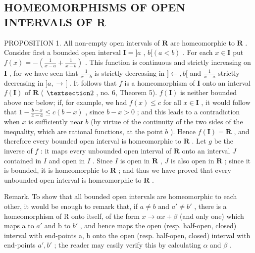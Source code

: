 \subsection{HOMEOMORPHISMS OF OPEN INTERVALS OF R}

PROPOSITION 1. All non-empty open intervals of \(\mathbf{R}\) are homeomorphic to \(\mathbf{R}\) . Consider first a bounded open interval \(\mathbf{I} = ]a\) , \(b[(a < b)\) . For each \(x \in \mathbf{I}\) put \(f(x) = -\left(\frac{1}{x - a} + \frac{1}{x - b}\right)\) . This function is continuous and strictly increasing on \(\mathbf{I}\) , for we have seen that \(\frac{1}{x - b}\) is strictly decreasing in \(]\leftarrow, b[\) and \(\frac{1}{x - a}\) strictly decreasing in \(]a, \rightarrow[\) . It follows that \(f\) is a homeomorphism of \(\mathbf{I}\) onto an interval \(f(\mathbf{I})\) of \(\mathbf{R}\) ( \(\S 2\) , no. 6, Theorem 5). \(f(\mathbf{I})\) is neither bounded above nor below; if, for example, we had \(f(x) \leqslant c\) for all \(x \in \mathbf{I}\) , it would follow that \(1 - \frac{b - x}{x - a} \leqslant c(b - x)\) , since \(b - x > 0\) ; and this leads to a contradiction when \(x\) is sufficiently near \(b\) (by virtue of the continuity of the two sides of the inequality, which are rational functions, at the point \(b\) ). Hence \(f(\mathbf{I}) = \mathbf{R}\) , and therefore every bounded open interval is homeomorphic to \(\mathbf{R}\) . Let \(g\) be the inverse of \(f\) : it maps every unbounded open interval of \(\mathbf{R}\) onto an interval \(J\) contained in \(I\) and open in \(I\) . Since \(I\) is open in \(\mathbf{R}\) , \(J\) is also open in \(\mathbf{R}\) ; since it is bounded, it is homeomorphic to \(\mathbf{R}\) ; and thus we have proved that every unbounded open interval is homeomorphic to \(\mathbf{R}\) .

Remark. To show that all bounded open intervals are homeomorphic to each other, it would be enough to remark that, if \(a \neq b\) and \(a' \neq b'\) , there is a homeomorphism of R onto itself, of the form \(x \to \alpha x + \beta\) (and only one) which maps a to \(a'\) and b to \(b'\) , and hence maps the open (resp. half-open, closed) interval with end-points a, b onto the open (resp. half-open, closed) interval with end-points \(a', b'\) ; the reader may easily verify this by calculating \(\alpha\) and \(\beta\) .

